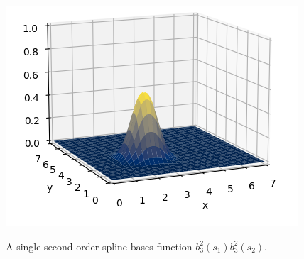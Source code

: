 \begin{marginfigure}[0in]
  \includegraphics[width=\linewidth]{./chap5_trajectory_planning/figures/spline_surface_basis}
  \caption{A single second order spline bases function $b_3^2(s_1)b_3^2(s_2)$.}
  \label{fig:spline_surface_bases}  
\end{marginfigure}


